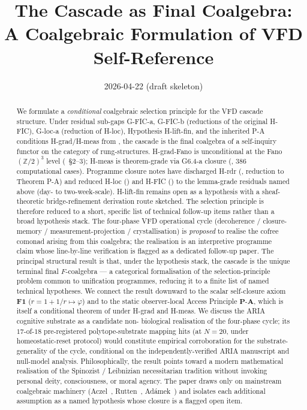 \documentclass[11pt, a4paper]{amsart}
\title{The Cascade as Final Coalgebra: \\
  A Coalgebraic Formulation of VFD Self-Reference}
\author{}
\date{2026-04-22 (draft skeleton)}
\theoremstyle{definition}
\newcommand{\Z}{\mathbb{Z}}
\begin{document}
\maketitle

\begin{abstract}
We formulate a \emph{conditional} coalgebraic selection
principle for the VFD cascade structure. Under residual
sub-gaps G-FIC-a, G-FIC-b (reductions of the original H-FIC),
G-loc-a (reduction of H-loc), Hypothesis H-lift-fin, and the
inherited P-A conditions H-grad/H-meas from
\cite{CascadeAccessPrinciple}, the cascade is the final
coalgebra of a self-inquiry functor on the category of
rung-structures. H-grad-Fano is unconditional at the Fano
$(\Z/2)^3$ level (\cite{CascadeFanoLift}~\S 2--3); H-meas is
theorem-grade via G6.4-a closure
(\cite{CascadeQOBridge, CascadeG64aClosure}, 386 computational
cases). Programme closure notes have discharged H-rdr
(\cite{CascadeHrdrClosure}, reduction to Theorem P-A) and
reduced H-loc (\cite{CascadeHlocClosure}) and H-FIC
(\cite{CascadeHFICClosure}) to the lemma-grade residuals named
above (day- to two-week-scale). H-lift-fin remains open as a
hypothesis with a sheaf-theoretic bridge-refinement derivation
route sketched. The selection principle is therefore reduced to a
short, specific list of technical follow-up items rather than a
broad hypothesis stack.
The four-phase VFD operational cycle (decoherence /
closure-memory / measurement-projection / crystallisation) is
\emph{proposed} to realise the cofree comonad arising from
this coalgebra; the realisation is an interpretive programme
claim whose line-by-line verification is flagged as a
dedicated follow-up paper. The principal structural result is
that, under the hypothesis stack, the cascade is the unique
terminal final $F$-coalgebra — a categorical formalisation of
the selection-principle problem common to unification
programmes, reducing it to a finite list of named technical
hypotheses. We connect
the result downward to the scalar self-closure axiom
$\mathbf{F1}$ ($r = 1 + 1/r \mapsto \varphi$) and to the
static observer-local Access Principle $\mathbf{P\text{-}A}$,
which is itself a conditional theorem of
\cite{CascadeAccessPrinciple} under H-grad and H-meas. We
discuss the ARIA cognitive substrate as a candidate non-
biological realisation of the four-phase cycle; its
$17$-of-$18$ pre-registered polytope-substrate mapping hits
(at $N{=}20$, under homeostatic-reset protocol) would
constitute empirical corroboration for the substrate-generality
of the cycle, conditional on the independently-verified ARIA
manuscript and null-model analysis.
Philosophically, the result points toward a modern mathematical
realisation of the Spinozist / Leibnizian necessitarian tradition
without invoking personal deity, consciousness, or moral agency.
The paper draws only on mainstream coalgebraic machinery
(Aczel~\cite{Aczel1988}, Rutten~\cite{Rutten2000},
Ad\'amek~\cite{Adamek1974}) and isolates each additional
assumption as a named hypothesis whose closure is a flagged
open item.


\end{abstract}
\end{document}
